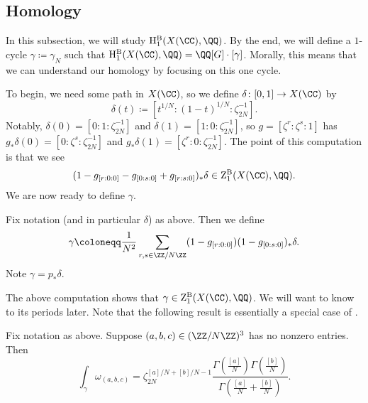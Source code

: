 \documentclass[../thesis.tex]{subfiles}
\begin{document}
\subsection{Homology}
In this subsection, we will study $\mathrm H_1^{\mathrm B}(X(\CC),\QQ)$. By the end, we will define a $1$-cycle $\gamma\coloneqq\gamma_N$ such that $\mathrm H_1^{\mathrm B}(X(\CC),\QQ)=\QQ[G]\cdot[\gamma]$. Morally, this means that we can understand our homology by focusing on this one cycle.

To begin, we need some path in $X(\CC)$, so we define $\delta\colon[0,1]\to X(\CC)$ by
\[\delta(t)\coloneqq\left[t^{1/N}:(1-t)^{1/N}:\zeta_{2N}^{-1}\right].\]
Notably, $\delta(0)=[0:1:\zeta_{2N}^{-1}]$ and $\delta(1)=[1:0:\zeta_{2N}^{-1}]$, so $g=[\zeta^r:\zeta^s:1]$ has $g_*\delta(0)=[0:\zeta^s:\zeta_{2N}^{-1}]$ and $g_*\delta(1)=[\zeta^r:0:\zeta_{2N}^{-1}]$. The point of this computation is that we see
\[(1-g_{[r:0:0]}-g_{[0:s:0]}+g_{[r:s:0]})_*\delta\in\mathrm Z^{\mathrm B}_1(X(\CC),\QQ).\]
We are now ready to define $\gamma$.
\begin{definition}
	Fix notation (and in particular $\delta$) as above. Then we define
	\[\gamma\coloneqq\frac1{N^2}\sum_{r,s\in\ZZ/N\ZZ}(1-g_{[r:0:0]})(1-g_{[0:s:0]})_*\delta.\]
	Note $\gamma=p_*\delta$.
\end{definition}
The above computation shows that $\gamma\in\mathrm Z^{\mathrm B}_1(X(\CC),\QQ)$. We will want to know to its periods later. Note that the following result is essentially a special case of \cite[Lemma~7.12]{deligne-hodge}.
\begin{lemma} \label{lem:gamma-periods}
	Fix notation as above. Suppose $(a,b,c)\in(\ZZ/N\ZZ)^3$ has no nonzero entries. Then
	\[\int_\gamma\omega_{(a,b,c)} = \zeta_{2N}^{[a]/N+[b]/N-1}\frac{\Gamma\left(\frac{[a]}N\right)\Gamma\left(\frac{[b]}N\right)}{\Gamma\left(\frac{[a]}N+\frac{[b]}N\right)}.\]
\end{lemma}
\end{document}
